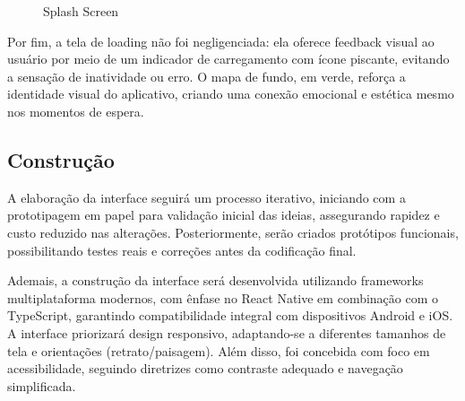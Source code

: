 \documentclass[a4paper, 12pt]{article}
\begin{document}
\begin{figure}[H]
  \centering
  \caption{Splash Screen}
  \label{fig:loading}
\end{figure}

Por fim, a tela de loading não foi negligenciada: ela oferece feedback visual ao usuário por meio de um indicador de carregamento com ícone piscante, evitando a sensação de inatividade ou erro. O mapa de fundo, em verde, reforça a identidade visual do aplicativo, criando uma conexão emocional e estética mesmo nos momentos de espera.

\subsection{Construção}

A elaboração da interface seguirá um processo iterativo, iniciando com a prototipagem em papel para validação inicial das ideias, assegurando rapidez e custo reduzido nas alterações. Posteriormente, serão criados protótipos funcionais, possibilitando testes reais e correções antes da codificação final. 

Ademais, a construção da interface será desenvolvida utilizando frameworks multiplataforma modernos, com ênfase no React Native em combinação com o TypeScript, garantindo compatibilidade integral com dispositivos Android e iOS. A interface priorizará design responsivo, adaptando-se a diferentes tamanhos de tela e orientações (retrato/paisagem). Além disso, foi concebida com foco em acessibilidade, seguindo diretrizes como contraste adequado e navegação simplificada.
\end{document}
